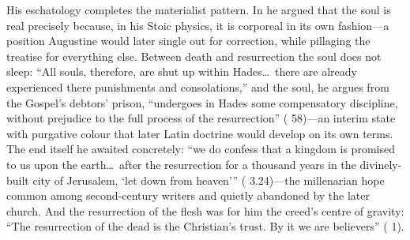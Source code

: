 His eschatology completes the materialist pattern. In  he argued that the soul is real precisely because, in his Stoic physics,
it is corporeal in its own fashion---a position Augustine would later single
out for correction, while pillaging the treatise for everything else. Between
death and resurrection the soul does not sleep: ``All souls, therefore, are
shut up within Hades\ldots\ there are already experienced there punishments
and consolations,'' and the soul, he argues from the Gospel's debtors' prison,
``undergoes in Hades some compensatory discipline, without prejudice to the
full process of the resurrection'' ( 58)---an
interim state with purgative colour that later Latin doctrine would develop
on its own terms. The end itself he awaited concretely: ``we do confess that
a kingdom is promised to us upon the earth\ldots\ after the resurrection for
a thousand years in the divinely-built city of Jerusalem, `let down from
heaven''' ( 3.24)---the millenarian hope common among
second-century writers and quietly abandoned by the later church. And the
resurrection of the flesh was for him the creed's centre of gravity: ``The
resurrection of the dead is the Christian's trust. By it we are believers''
( 1).

